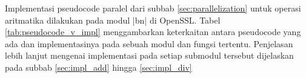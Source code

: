     Implementasi pseudocode paralel dari subbab \ref{sec:parallelization} untuk operasi aritmatika dilakukan pada modul |bn| di OpenSSL. Tabel \ref{tab:pseudocode_v_impl} menggambarkan keterkaitan antara pseudocode yang ada dan implementasinya pada sebuah modul dan fungsi tertentu. Penjelasan lebih lanjut mengenai implementasi pada setiap submodul tersebut dijelaskan pada subbab \ref{sec:impl_add} hingga \ref{sec:impl_div}

    
    
    
